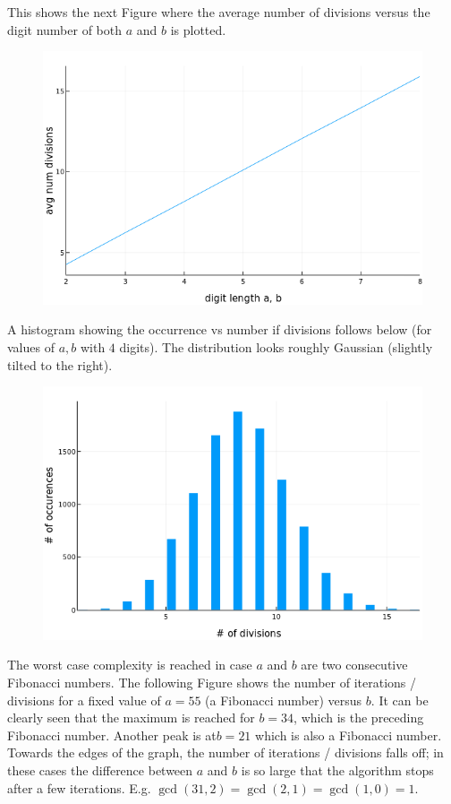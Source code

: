 This shows the next Figure where the average number of divisions versus the digit number of both $a$ and $b$ is plotted.

\begin{figure}[H]
	\includegraphics[scale=0.5]{images/gcd_num_div_avg.png}
\end{figure}

A histogram showing the occurrence vs number if divisions follows below (for values of $a,b$ with $4$ digits). The distribution looks roughly Gaussian (slightly tilted to the right).

\begin{figure}[H]
	\includegraphics[scale=0.5]{images/gcd_num_div_hist.png}
\end{figure}

The worst case complexity is reached in case $a$ and $b$ are two consecutive Fibonacci numbers. The following Figure shows the number of iterations / divisions  for a fixed value of $a=55$ (a Fibonacci number) versus $b$. It can be clearly seen that the maximum is reached for $b=34$, which is the preceding Fibonacci number. Another peak is at$b=21$ which is also a Fibonacci number. Towards the edges of the graph, the number of iterations / divisions falls off; in these cases the difference between $a$ and $b$ is so large that the algorithm stops after a few iterations. E.g. $\gcd(31,2) = \gcd(2,1) = \gcd(1,0) = 1$.


